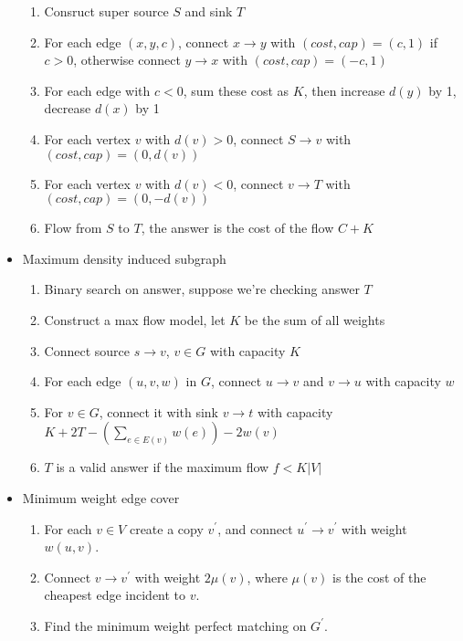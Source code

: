 \begin{itemize}
    \begin{enumerate}
        \item Consruct super source $S$ and sink $T$
        \item For each edge $(x, y, c)$, connect $x \rightarrow y$ with $(cost, cap) = (c, 1)$ if $c > 0$, otherwise connect $y \rightarrow x$ with $(cost, cap) = (-c, 1)$
        \item For each edge with $c < 0$, sum these cost as $K$, then increase $d(y)$ by 1, decrease $d(x)$ by 1
        \item For each vertex $v$ with $d(v) > 0$, connect $S \rightarrow v$ with $(cost, cap) = (0, d(v))$
        \item For each vertex $v$ with $d(v) < 0$, connect $v \rightarrow T$ with $(cost, cap) = (0, -d(v))$
        \item Flow from $S$ to $T$, the answer is the cost of the flow $C + K$
    \end{enumerate}
    \item Maximum density induced subgraph
    \begin{enumerate}
        \item Binary search on answer, suppose we're checking answer $T$
        \item Construct a max flow model, let $K$ be the sum of all weights
        \item Connect source $s \rightarrow v$, $v \in G$ with capacity $K$
        \item For each edge $(u, v, w)$ in $G$, connect $u \rightarrow v$ and $v \rightarrow u$ with capacity $w$
        \item For $v \in G$, connect it with sink $v \rightarrow t$ with capacity $K + 2T - (\sum_{e \in E(v)}{w(e)}) - 2w(v)$
        \item $T$ is a valid answer if the maximum flow $f < K \lvert V \rvert$
    \end{enumerate}
    \item Minimum weight edge cover
    \begin{enumerate}
      \item For each $v \in V$ create a copy $v^\prime$, and connect $u^\prime \to v^\prime$ with weight $w(u, v)$.
      \item Connect $v \to v^\prime$ with weight $2\mu(v)$, where $\mu(v)$ is the cost of the cheapest edge incident to $v$.
      \item Find the minimum weight perfect matching on $G^\prime$.
    \end{enumerate}

\end{itemize}
